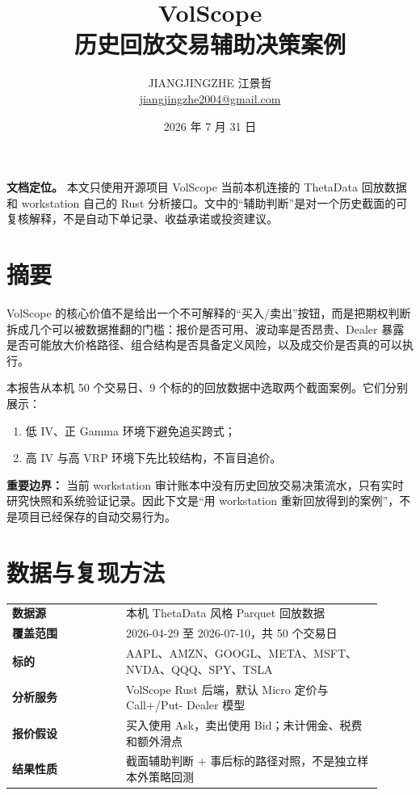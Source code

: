 \documentclass[UTF8,a4paper,11pt]{ctexart}
\title{\vspace{-1.1cm}\textcolor{ink}{VolScope\\历史回放交易辅助决策案例}}
\author{JIANGJINGZHE 江景哲\\\href{mailto:jiangjingzhe2004@gmail.com}{jiangjingzhe2004@gmail.com}}
\date{2026 年 7 月 31 日}
\begin{document}
\maketitle

\begin{center}
\colorbox{soft}{\parbox{0.94\linewidth}{\textbf{文档定位。} 本文只使用开源项目 VolScope 当前本机连接的 ThetaData 回放数据和 workstation 自己的 Rust 分析接口。文中的“辅助判断”是对一个历史截面的可复核解释，不是自动下单记录、收益承诺或投资建议。}}
\end{center}

\section{摘要}

VolScope 的核心价值不是给出一个不可解释的“买入/卖出”按钮，而是把期权判断拆成几个可以被数据推翻的门槛：报价是否可用、波动率是否昂贵、Dealer 暴露是否可能放大价格路径、组合结构是否具备定义风险，以及成交价是否真的可以执行。

本报告从本机 50 个交易日、9 个标的的回放数据中选取两个截面案例。它们分别展示：

\begin{enumerate}
  \item 低 IV、正 Gamma 环境下避免追买跨式；
  \item 高 IV 与高 VRP 环境下先比较结构，不盲目追价。
\end{enumerate}

\textbf{重要边界：} 当前 workstation 审计账本中没有历史回放交易决策流水，只有实时研究快照和系统验证记录。因此下文是“用 workstation 重新回放得到的案例”，不是项目已经保存的自动交易行为。

\section{数据与复现方法}

\begin{tabular}{>{\bfseries}p{0.28\linewidth}p{0.63\linewidth}}
\toprule
数据源 & 本机 ThetaData 风格 Parquet 回放数据\\
覆盖范围 & 2026-04-29 至 2026-07-10，共 50 个交易日\\
标的 & AAPL、AMZN、GOOGL、META、MSFT、NVDA、QQQ、SPY、TSLA\\
分析服务 & VolScope Rust 后端，默认 Micro 定价与 Call+/Put- Dealer 模型\\
报价假设 & 买入使用 Ask，卖出使用 Bid；未计佣金、税费和额外滑点\\
结果性质 & 截面辅助判断 + 事后标的路径对照，不是独立样本外策略回测\\
\bottomrule
\end{tabular}
\end{document}
